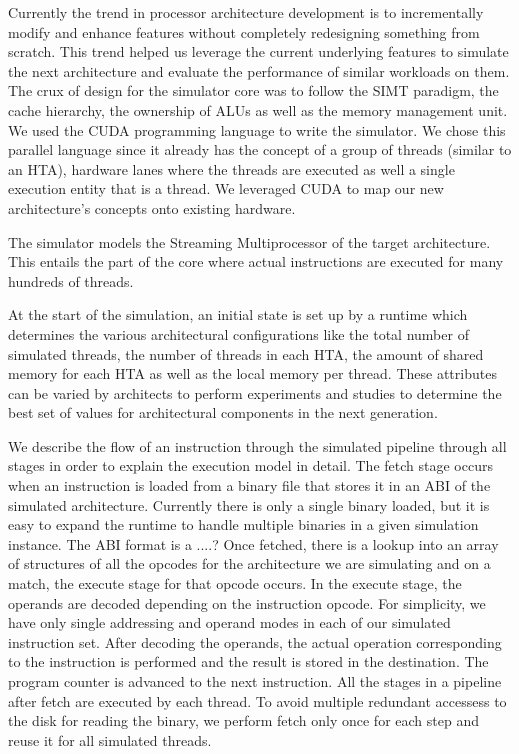 \documentclass[conference, 10pt]{IEEEtran}
\begin{document}

Currently the trend in processor architecture development is to incrementally 
modify and enhance features without completely redesigning something from scratch. 
This trend helped us leverage the current underlying features to simulate the 
next architecture and evaluate the performance of similar workloads on them. 
The crux of design for the simulator core was to follow the SIMT paradigm, the 
cache hierarchy, the ownership of ALUs as well as the memory management unit. 
We used the CUDA programming language to write the simulator. We chose this 
parallel language since it already has the concept of a group of threads (similar 
to an HTA), hardware lanes where the threads are executed as well a single 
execution entity that is a thread. We leveraged CUDA to map our new architecture's 
concepts onto existing hardware. 

The simulator models the Streaming Multiprocessor of the target architecture. This
entails the part of the core where actual instructions are executed for many
hundreds of threads. 

At the start of the simulation, an initial state is set up by a runtime which 
determines the various architectural configurations like the total number of 
simulated threads, the number of threads in each HTA, the amount of shared 
memory for each HTA as well as the local memory per thread. These attributes 
can be varied by architects to perform experiments and studies to determine 
the best set of values for architectural components in the next generation. 

We describe the flow of an instruction through the simulated 
pipeline through all stages in order to explain the execution model in detail. 
The fetch stage occurs when an instruction is loaded from a binary file that 
stores it in an ABI of the simulated architecture. Currently there is only a 
single binary loaded, but it is easy to expand the runtime to handle multiple 
binaries in a given simulation instance. The ABI format is a ....?
Once fetched, there is a lookup into an array of structures of all the opcodes 
for the architecture we are simulating and on a match, the execute stage for that 
opcode occurs. In the execute stage, the operands are decoded depending on the 
instruction opcode. For simplicity, we have only single addressing and operand modes
in each of our simulated instruction set. After decoding the operands, the actual 
operation corresponding to the instruction is performed and the result is stored 
in the destination. The program counter is advanced to the next instruction. 
All the stages in a pipeline after fetch are executed by each thread. To avoid 
multiple redundant accessess to the disk for reading the binary, we perform fetch 
only once for each step and reuse it for all simulated threads.
  
\end{document}
